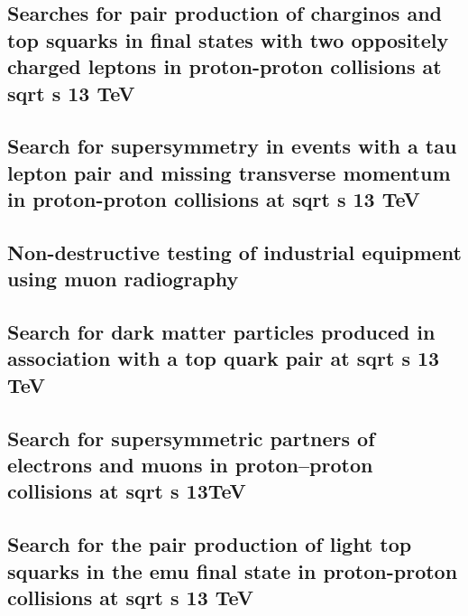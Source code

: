 \documentclass[a4paper, 11pt, twoside, openright]{report}
\begin{document}
\subsection{Searches for pair production of charginos and top squarks in final states with two oppositely charged leptons in proton-proton collisions at sqrt s 13 TeV}


\subsection{Search for supersymmetry in events with a tau lepton pair and missing transverse momentum in proton-proton collisions at sqrt s 13 TeV}


\subsection{Non-destructive testing of industrial equipment using muon radiography}


\subsection{Search for dark matter particles produced in association with a top quark pair at sqrt s 13 TeV}


\subsection{Search for supersymmetric partners of electrons and muons in proton–proton collisions at sqrt s 13TeV}


\subsection{Search for the pair production of light top squarks in the emu final state in proton-proton collisions at sqrt s 13 TeV}

\end{document}
